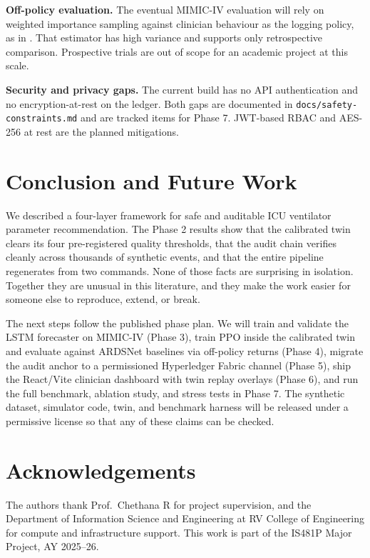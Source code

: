 \documentclass[conference]{IEEEtran}
\begin{document}
\textbf{Off-policy evaluation.} The eventual MIMIC-IV evaluation will rely on weighted importance sampling against clinician behaviour as the logging policy, as in \cite{liu2024rl}. That estimator has high variance and supports only retrospective comparison. Prospective trials are out of scope for an academic project at this scale.

\textbf{Security and privacy gaps.} The current build has no API authentication and no encryption-at-rest on the ledger. Both gaps are documented in \texttt{docs/safety-constraints.md} and are tracked items for Phase 7. JWT-based RBAC and AES-256 at rest are the planned mitigations.

\section{Conclusion and Future Work}
\label{sec:conclusion}

We described a four-layer framework for safe and auditable ICU ventilator parameter recommendation. The Phase 2 results show that the calibrated twin clears its four pre-registered quality thresholds, that the audit chain verifies cleanly across thousands of synthetic events, and that the entire pipeline regenerates from two commands. None of those facts are surprising in isolation. Together they are unusual in this literature, and they make the work easier for someone else to reproduce, extend, or break.

The next steps follow the published phase plan. We will train and validate the LSTM forecaster on MIMIC-IV (Phase 3), train PPO inside the calibrated twin and evaluate against ARDSNet baselines via off-policy returns (Phase 4), migrate the audit anchor to a permissioned Hyperledger Fabric channel (Phase 5), ship the React/Vite clinician dashboard with twin replay overlays (Phase 6), and run the full benchmark, ablation study, and stress tests in Phase 7. The synthetic dataset, simulator code, twin, and benchmark harness will be released under a permissive license so that any of these claims can be checked.

\section*{Acknowledgements}
The authors thank Prof.\ Chethana R for project supervision, and the Department of Information Science and Engineering at RV College of Engineering for compute and infrastructure support. This work is part of the IS481P Major Project, AY 2025--26.
\end{document}
